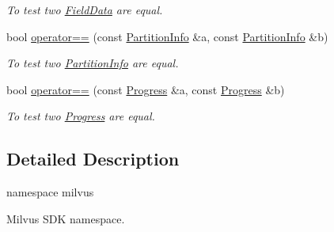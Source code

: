 \begin{DoxyCompactItemize}
\begin{DoxyCompactList}\small\item\em To test two \hyperlink{classmilvus_1_1_field_data}{Field\+Data} are equal. \end{DoxyCompactList}\item 
\mbox{\label{namespacemilvus_a1766e577643b07c7292147cc33adb724}} 
bool \hyperlink{namespacemilvus_a1766e577643b07c7292147cc33adb724}{operator==} (const \hyperlink{classmilvus_1_1_partition_info}{Partition\+Info} \&a, const \hyperlink{classmilvus_1_1_partition_info}{Partition\+Info} \&b)
\begin{DoxyCompactList}\small\item\em To test two \hyperlink{classmilvus_1_1_partition_info}{Partition\+Info} are equal. \end{DoxyCompactList}\item 
\mbox{\label{namespacemilvus_ae89ba7744a4ea07a4482acdbf783e4c0}} 
bool \hyperlink{namespacemilvus_ae89ba7744a4ea07a4482acdbf783e4c0}{operator==} (const \hyperlink{structmilvus_1_1_progress}{Progress} \&a, const \hyperlink{structmilvus_1_1_progress}{Progress} \&b)
\begin{DoxyCompactList}\small\item\em To test two \hyperlink{structmilvus_1_1_progress}{Progress} are equal. \end{DoxyCompactList}\end{DoxyCompactItemize}


\subsection{Detailed Description}
namespace milvus 

Milvus S\+DK namespace. 